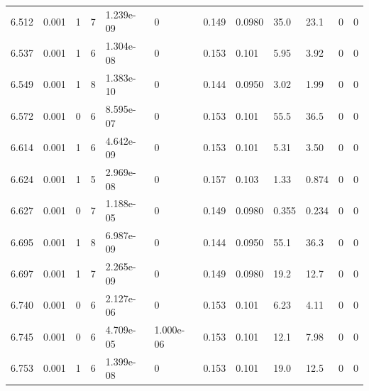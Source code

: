 \documentclass[preview]{standalone}
\begin{document}
{{{{{{\begin{tabular}{L{1.2cm}C{1.2cm} C{0.3cm}C{0.5cm} C{1.4cm}C{1.4cm} C{1.4cm}C{1.4cm} C{1.6cm}C{1.6cm} C{1.6cm}C{1.6cm}}
  6.512  &  0.001  & 1     &  7 &  1.239e-09  & 0  &  0.149&   0.0980& 35.0 & 23.1   &  0 & 0  \\ 
  6.537  &  0.001  & 1     &  6 &  1.304e-08  & 0  &  0.153&   0.101& 5.95 & 3.92   &  0 & 0  \\ 
  6.549  &  0.001  & 1     &  8 &  1.383e-10  & 0  &  0.144&   0.0950& 3.02 & 1.99   &  0 & 0  \\ 
  6.572  &  0.001  & 0     &  6 &  8.595e-07  & 0  &  0.153&   0.101& 55.5 & 36.5   &  0 & 0  \\ 
  6.614  &  0.001  & 1     &  6 &  4.642e-09  & 0  &  0.153&   0.101& 5.31 & 3.50   &  0 & 0  \\ 
  6.624  &  0.001  & 1     &  5 &  2.969e-08  & 0  &  0.157&   0.103& 1.33 & 0.874   &  0 & 0  \\ 
  6.627  &  0.001  & 0     &  7 &  1.188e-05  & 0  &  0.149&   0.0980& 0.355 & 0.234   &  0 & 0  \\ 
  6.695  &  0.001  & 1     &  8 &  6.987e-09  & 0  &  0.144&   0.0950& 55.1 & 36.3   &  0 & 0  \\ 
  6.697  &  0.001  & 1     &  7 &  2.265e-09  & 0  &  0.149&   0.0980& 19.2 & 12.7   &  0 & 0  \\ 
  6.740  &  0.001  & 0     &  6 &  2.127e-06  & 0  &  0.153&   0.101& 6.23 & 4.11   &  0 & 0  \\ 
  6.745  &  0.001  & 0     &  6 &  4.709e-05  & 1.000e-06  &  0.153&   0.101& 12.1 & 7.98   &  0 & 0  \\ 
  6.753  &  0.001  & 1     &  6 &  1.399e-08  & 0  &  0.153&   0.101& 19.0 & 12.5   &  0 & 0  \\ 
\hline 
\end{tabular} 

}}}}}}
\end{document}

